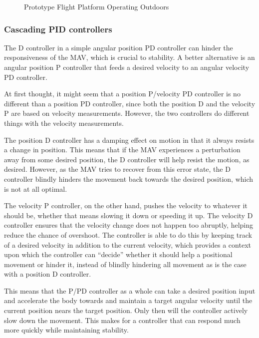 \documentclass[12pt,letterpaper]{article}
\begin{document}
\begin{figure}[h!]
\caption{Prototype Flight Platform Operating Outdoors}
\end{figure}



\subsubsection*{Cascading PID controllers}

The D controller in a simple angular position PD controller can hinder the
responsiveness of the MAV, which is crucial to stability. A better alternative
is an angular position P controller that feeds a desired velocity to an angular
velocity PD controller.

At first thought, it might seem that a position P/velocity PD controller is no
different than a position PD controller, since both the position D and the
velocity P are based on velocity measurements. However, the two controllers do
different things with the velocity measurements.

The position D controller has a damping effect on motion in that it always
resists a change in position. This means that if the MAV experiences a
perturbation away from some desired position, the D controller will help resist
the motion, as desired. However, as the MAV tries to recover from this error
state, the D controller blindly hinders the movement back towards the desired
position, which is not at all optimal.

The velocity P controller, on the other hand, pushes the velocity to whatever
it should be, whether that means slowing it down or speeding it up. The
velocity D controller ensures that the velocity change does not happen too
abruptly, helping reduce the chance of overshoot. The controller is able to do
this by keeping track of a desired velocity in addition to the current
velocity, which provides a context upon which the controller can ``decide''
whether it should help a positional movement or hinder it, instead of blindly
hindering all movement as is the case with a position D controller.

This means that the P/PD controller as a whole can take a desired position
input and accelerate the body towards and maintain a target angular velocity
until the current position nears the target position. Only then will the
controller actively slow down the movement. This makes for a controller that
can respond much more quickly while maintaining stability.
\end{document}
